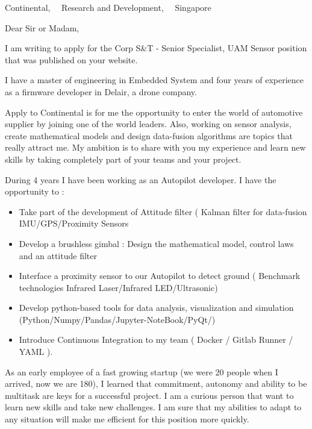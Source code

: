 \documentclass{scrlttr2}
\renewcommand{\\}{\ {\large\textperiodcentered}\ }
\begin{document}

\begin{letter}{ %
Continental,\\
Research and Development,\\
Singapore
}


\opening{Dear Sir or Madam,}

I am writing to apply for the Corp S\&T - Senior Specialist, UAM Sensor position that was published on your website.

I have a master of engineering in Embedded System and four years of experience
as a firmware developer in Delair, a drone company.

Apply to Continental is for me the opportunity to enter the world of automotive supplier by joining one of the world leaders.
Also, working on sensor analysis, create mathematical models and design data-fusion algorithms are topics that really attract me.
My ambition is to share with you my experience and learn new skills by taking completely part of your teams and your project.

During 4 years I have been working as an Autopilot developer. I have the opportunity to :
\begin{itemize}
\item Take part of the development of Attitude filter ( Kalman filter for data-fusion IMU/GPS/Proximity Sensors
\item Develop a brushless gimbal : Design the mathematical model, control laws and an attitude filter
\item Interface a proximity sensor to our Autopilot to detect ground ( Benchmark technologies Infrared Laser/Infrared LED/Ultrasonic)
\item Develop python-based tools for data analysis, visualization and simulation (Python/Numpy/Pandas/Jupyter-NoteBook/PyQt/)
\item Introduce Continuous Integration to my team ( Docker / Gitlab Runner / YAML ).
\end{itemize}

As an early employee of a fast growing startup (we were 20 people when I arrived, now we are 180), I learned that commitment, autonomy and ability to be multitask are keys for a successful project. I am a curious person that want to learn new skills and take new challenges. I am sure that my abilities to adapt to any situation will make me efficient for this position more quickly.


\end{letter}
\end{document}
